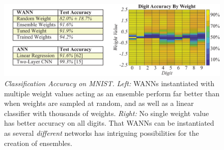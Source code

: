 

\begin{figure}[!htb]        
\vskip -0.10in %
    \centering        
    \includegraphics[width=1\textwidth]{img/mnist.pdf}   
\vskip -0.20in %
    \caption      
    {     
        \textit{Classification Accuracy on MNIST.
        }
        \newline
        \textit{Left:}
        WANNs instantiated with multiple weight values acting as an ensemble perform far better than when weights are sampled at random, and as well as a linear classifier with thousands of weights. 
        \newline
        \textit{Right:} No single weight value has better accuracy on all digits. That WANNs can be instantiated as several \textit{different} networks has intriguing possibilities for the creation of ensembles.       
    }
    \label{fig:mnist}
\vskip -0.05in %
\end{figure}
